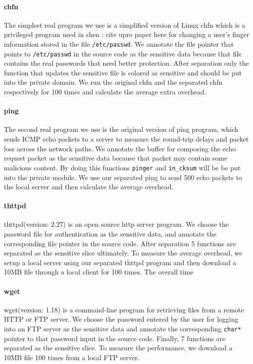 \paragraph{chfn}
The simplest real program we use is a simplified version of Linux chfn which is a privileged program used in {shen \todo: cite upro paper here} for changing a user's finger information stored in the file \texttt{/etc/passwd}. We annotate the file pointer that points to \texttt{/etc/passwd} in the source code as the sensitive data because that file contains the real passwords that need better protection. After separation only the function that updates the sensitive file is colored as sensitive and should be put into the private domain. We run the original chfn and the separated chfn respectively for 100 times and calculate the average extra overhead. 

\paragraph{ping}
The second real program we use is the original version of ping program, which sends ICMP echo packets to a server to measure the round-trip delays and packet loss across the network paths. We annotate the buffer for composing the echo request packet as the sensitive data because that packet may contain some malicious content. By doing this functions \texttt{pinger} and \texttt{in\_cksum} will be be put into the private module. We use our separated ping to send 500 echo packets to the local server and then calculate the average overhead.


\paragraph{thttpd}
thttpd(version: 2.27) is an open source http server program. We choose the password file for authentication as the sensitive data, and annotate the corresponding file pointer in the source code. After separation 5 functions are separated as the sensitive slice ultimately. To measure the average overhead, we setup a local server using our separated thttpd program and then download a 10MB file through a local client for 100 times. The overall time

\paragraph{wget}
wget(version: 1.18) is a command-line program for retrieving files from a remote HTTP or FTP server. We choose the password entered by the user for logging into an FTP server as the sensitive data and annotate the corresponding \texttt{char*} pointer to that password input in the source code. Finally, 7 functions are separated as the sensitive slice. To measure the performance, we download a 10MB file 100 times from a local FTP server.



